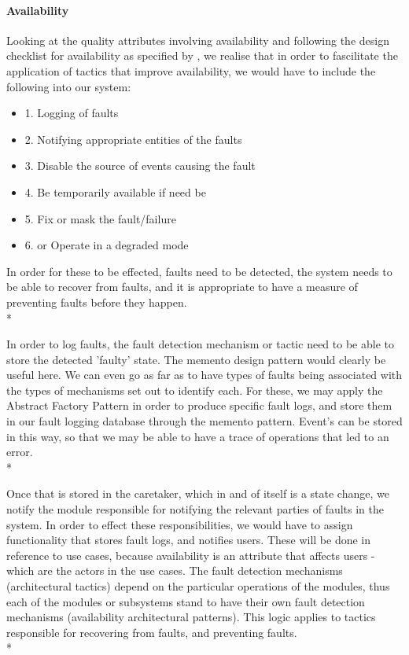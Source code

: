 \documentclass[11pt]{article}
\begin{document}
\paragraph{Availability}
Looking at the quality attributes involving availability and following the design checklist for availability as specified by \cite{Book:2}, we realise that in order to fascilitate the application of tactics that improve availability, we would have to include the following into our system:
\begin{itemize}
	\item[] 1. Logging of faults
	\item[] 2. Notifying appropriate entities of the faults
	\item[] 3. Disable the source of events causing the fault
	\item[] 4. Be temporarily available if need be
	\item[] 5. Fix or mask the fault/failure
	\item[] 6. or Operate in a degraded mode
\end{itemize}

In order for these to be effected, faults need to be detected, the system needs to be able to recover from faults, and it is appropriate to have a measure of preventing faults before they happen.\\*

In order to log faults, the fault detection mechanism or tactic need to be able to store the detected 'faulty' state. The memento design pattern would clearly be useful here. We can even go as far as to have types of faults being associated with the types of mechanisms set out to identify each. For these, we may apply the Abstract Factory Pattern in order to produce specific fault logs, and store them in our fault logging database through the memento pattern. Event's can be stored in this way, so that we may be able to have a trace of operations that led to an error.\\*

Once that is stored in the caretaker, which in and of itself is a state change, we notify the module responsible for notifying the relevant parties of faults in the system. In order to effect these responsibilities, we would have to assign functionality that stores fault logs, and notifies users. These will be done in reference to use cases, because availability is an attribute that affects users - which are the actors in the use cases. The fault detection mechanisms (architectural tactics) depend on the particular operations of the modules, thus each of the modules or subsystems stand to have their own fault detection mechanisms (availability architectural patterns). This logic applies to tactics responsible for recovering from faults, and preventing faults.\\*
\end{document}

